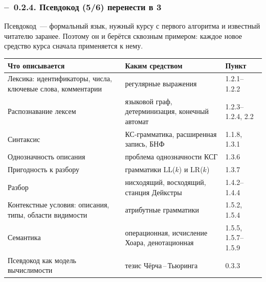 \documentclass[mathserif,12pt,aspectratio=169]{beamer}
\def\NB#1{{\bf\color{brown}#1}}
\def\Er{{\color{red}\textbf{--}\ }}
\begin{document}
\begin{frame}
\frametitle{\Er 0.2.4. Псевдокод (5/6) \NB{перенести в 3}}

Псевдокод~--- формальный язык, нужный курсу с первого алгоритма и известный
читателю заранее. Поэтому он и берётся сквозным примером: каждое новое средство
курса сначала применяется к нему.

\vspace{-2pt}
\begin{center}\scriptsize
\begin{tabular}{|p{5.5cm}|p{5.4cm}|l|}
\hline
Что описывается & Каким средством & Пункт \\
\hline
Лексика: идентификаторы, числа, ключевые слова, комментарии & регулярные
выражения & 1.2.1--1.2.2 \\
Распознавание лексем & языковой граф, детерминизация, конечный автомат &
1.2.3--1.2.4, 2.2 \\
Синтаксис & КС-грамматика, расширенная запись, БНФ & 1.1.8, 1.3.1 \\
Однозначность описания & проблема однозначности КСГ & 1.3.6 \\
Пригодность к разбору & грамматики LL($k$) и LR($k$) & 1.3.7 \\
Разбор & нисходящий, восходящий, станция Дейкстры & 1.4.2--1.4.4 \\
Контекстные условия: описания, типы, области видимости & атрибутные грамматики &
1.5.2, 1.5.4 \\
Семантика & операционная, исчисление Хоара, денотационная & 1.5.5, 1.5.7--1.5.9 \\
Псевдокод как модель вычислимости & тезис Чёрча\,--\,Тьюринга & 0.3.3 \\
\hline
\end{tabular}
\end{center}
\end{frame}
\end{document}
